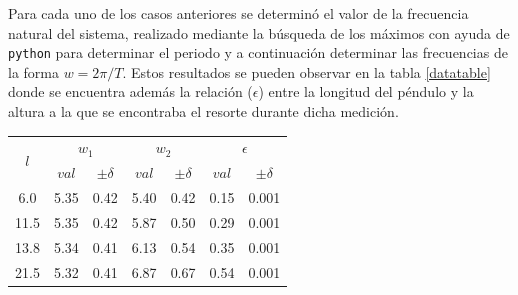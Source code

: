 \documentclass[10pt]{article}
\begin{document}
        Para cada uno de los casos anteriores se determinó el valor de la frecuencia natural del sistema, realizado mediante la búsqueda de los máximos con ayuda de \texttt{python} para determinar el periodo y a continuación determinar las frecuencias de la forma $ w = 2 \pi / T $. Estos resultados se pueden observar en la tabla \ref{datatable} donde se encuentra además la relación ($ \epsilon $) entre la longitud del péndulo y la altura a la que se encontraba el resorte durante dicha medición.
 
        \begin{table}[H]
            \centering
            \begin{tabular}{|c|ll|ll|ll|}
            \hline
            \multirow{2}{*}{\textbf{$l$}} & \multicolumn{2}{c|}{\textbf{$w_1$}}                                      & \multicolumn{2}{c|}{\textbf{$w_2$}}                                      & \multicolumn{2}{c|}{\textbf{$ \epsilon $}}                                       \\ \cline{2-7} 
                                                        & \multicolumn{1}{c|}{\textbf{$val$}} & \multicolumn{1}{c|}{\textbf{$\pm\delta$}} & \multicolumn{1}{c|}{\textbf{$val$}} & \multicolumn{1}{c|}{\textbf{$\pm\delta$}} & \multicolumn{1}{c|}{\textbf{$val$}} & \multicolumn{1}{c|}{\textbf{$\pm\delta$}} \\ \hline
            6.0                                         & \multicolumn{1}{l|}{5.35}         & 0.42                              & \multicolumn{1}{l|}{5.40}         & 0.42                              & \multicolumn{1}{l|}{0.15}         & 0.001                             \\ \hline
            11.5                                        & \multicolumn{1}{l|}{5.35}         & 0.42                              & \multicolumn{1}{l|}{5.87}         & 0.50                              & \multicolumn{1}{l|}{0.29}         & 0.001                             \\ \hline
            13.8                                        & \multicolumn{1}{l|}{5.34}         & 0.41                              & \multicolumn{1}{l|}{6.13}         & 0.54                              & \multicolumn{1}{l|}{0.35}         & 0.001                             \\ \hline
            21.5                                        & \multicolumn{1}{l|}{5.32}         & 0.41                              & \multicolumn{1}{l|}{6.87}         & 0.67                              & \multicolumn{1}{l|}{0.54}         & 0.001                             \\ \hline

\end{tabular}
\end{table}
\end{document}
